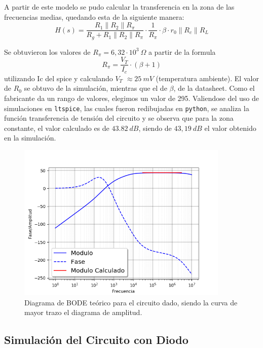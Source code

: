 \documentclass[a4paper]{article}
\begin{document}
A partir de este modelo se pudo calcular la transferencia en la zona de las frecuencias medias, quedando esta de la siguiente manera: \[H(s)=\frac{R_1\parallel R_2\parallel R_\pi}{R_g+R_1\parallel R_2\parallel R_\pi}\cdot \frac{1}{R_\pi} \cdot \beta \cdot r_0 \parallel R_c \parallel R_L  \]

Se obtuvieron los valores de $R_\pi = 6,32 \cdot 10^{3} \ \Omega$ a partir de la formula \[R_\pi = \frac{V_T}{I_c}\cdot (\beta +1) \] utilizando Ic del spice y calculando $V_T$ $\approx 25 \ mV$ (temperatura ambiente).
El valor de $R_0$ se obtuvo de la simulación, mientras que el de $\beta$, de la datasheet. Como el fabricante da un rango de valores, elegimos un valor de 295.
Valiendose del uso de simulaciones en \texttt{ltspice}, las cuales fueron redibujadas en \texttt{python}, se analiza la función transferencia de tensión del circuito y se observa que para la zona constante, el valor calculado es de $43.82 \ dB$, siendo de $43,19 \ dB$ el valor obtenido en la simulación.

\begin{figure}[H]
	\centering
	\includegraphics[width=0.9\textwidth]{RtaF2.png}	
	\caption{Diagrama de BODE teórico para el circuito dado, siendo la curva de mayor trazo el diagrama de amplitud.}
	\label{fig:bode}
\end{figure}


\subsection*{Simulación del Circuito con Diodo}
\end{document}
